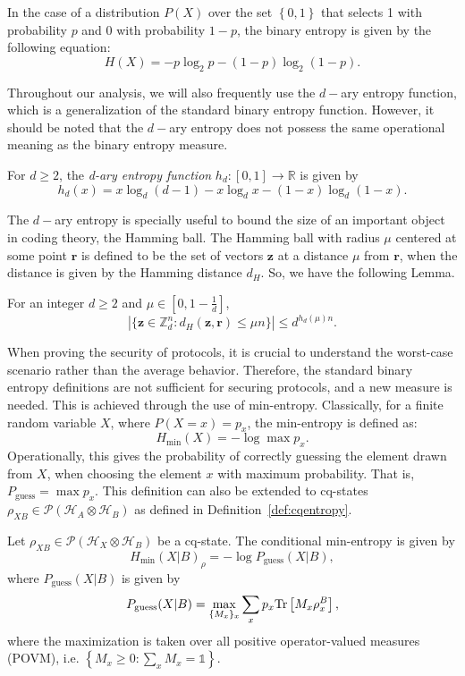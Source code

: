 In the case of a distribution $P(X)$ over the set $\left\{0,1\right\}$ that selects 1 with probability $p$ and 0 with probability $1-p$, the binary entropy is given by the following equation:
$$H(X) = -p \log_2 p - (1-p)\log_2(1-p).$$

Throughout our analysis, we will also frequently use the $d-$ary entropy function, which is a generalization of the standard binary entropy function. However, it should be noted that the $d-$ary entropy does not possess the same operational meaning as the binary entropy measure.

\begin{definition}
For $d\geq 2$, the \textit{d-ary entropy function} $h_d : [0,1]\rightarrow\mathbb{R}$ is given by
$$h_d(x) = x \log_d(d-1) - x \log_d x - (1-x) \log_d (1-x).$$
\label{def:q-ary}
\end{definition}
The $d-$ary entropy is specially useful to bound the size of an important object in coding theory, the Hamming ball. The Hamming ball with radius $\mu$ centered at some point $\bm{r}$ is defined to be the set of vectors $\bm{z}$ at a distance $\mu$ from $\bm{r}$, when the distance is given by the Hamming distance $d_H$. So, we have the following Lemma.

\begin{lemma}
\label{lemma:hammingBall}
For an integer $d\geq 2$ and $\mu \in [0, 1-\frac{1}{d}]$,
\begin{equation*}
    |\{ \boldsymbol{z}\in \mathbb{Z}_d^{n}: d_H(\boldsymbol{z}, \boldsymbol{r})\leq \mu n \}| \leq d^{h_d(\mu)n}.
\end{equation*}
\end{lemma} 

When proving the security of protocols, it is crucial to understand the worst-case scenario rather than the average behavior. Therefore, the standard binary entropy definitions are not sufficient for securing protocols, and a new measure is needed. This is achieved through the use of min-entropy. Classically, for a finite random variable $X$, where $P(X=x) = p_x$, the min-entropy is defined as:
$$H_{\min}(X) = -\log \max p_x.$$
Operationally, this gives the probability of correctly guessing the element drawn from $X$, when choosing the element $x$ with maximum probability. That is, $P_{\text{guess}} = \max p_x$. This definition can also be extended to cq-states $\rho_{XB}\in\mathcal{P}(\mathcal{H}_A \otimes \mathcal{H}_B)$ as defined in Definition~\ref{def:cqentropy}.

\begin{definition}
\label{def:cqentropy}
Let $\rho_{X B}\in\mathcal{P}(\mathcal{H}_X \otimes \mathcal{H}_{B})$ be a cq-state. The conditional min-entropy is given by
$$H_{\min}(X|B)_{\rho} = -\log P_{\text{guess}}(X|B),$$
where $P_{\text{guess}}(X|B)$ is given by
$$P_{\text{guess}}(X|B) = \max_{\{M_x\}_x} \sum_x p_x \text{Tr}\left[M_x \rho_{x}^B\right],$$
where the maximization is taken over all positive operator-valued measures (POVM), i.e. $\left\{ M_x \geq 0 : \sum_x M_x = \mathds{1} \right\}$.
\end{definition}

